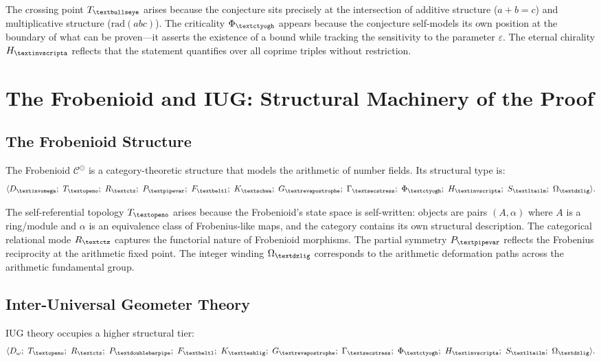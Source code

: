 \documentclass[12pt]{article}
\newcommand{\invomega}{\text{\textinvomega}}
\newcommand{\beltl}{\text{\textbeltl}}
\newcommand{\revapostrophe}{\text{\textrevapostrophe}}
\newcommand{\secstress}{\text{\textsecstress}}
\newcommand{\igbullseye}{\text{\textbullseye}}
\newcommand{\igschwa}{\text{\textschwa}}
\newcommand{\ctyogh}{\text{\textctyogh}}
\newcommand{\invscripta}{\text{\textinvscripta}}
\newcommand{\ltailm}{\text{\textltailm}}
\newcommand{\openo}{\text{\textopeno}}
\newcommand{\ctz}{\text{\textctz}}
\newcommand{\pipevar}{\text{\textpipevar}}
\newcommand{\dzlig}{\text{\textdzlig}}
\newcommand{\doublebarpipe}{\text{\textdoublebarpipe}}
\newcommand{\teshlig}{\text{\textteshlig}}
\begin{document}
The crossing point $T_{\igbullseye}$ arises because the conjecture sits precisely at the intersection of additive structure ($a + b = c$) and multiplicative structure ($\text{rad}(abc)$). The criticality $\Phi_{\ctyogh}$ appears because the conjecture self-models its own position at the boundary of what can be proven---it asserts the existence of a bound while tracking the sensitivity to the parameter $\varepsilon$. The eternal chirality $H_{\invscripta}$ reflects that the statement quantifies over all coprime triples without restriction.
\section{The Frobenioid and IUG: Structural Machinery of the Proof}

\subsection{The Frobenioid Structure}

The Frobenioid $\mathcal{C}^\odot$ is a category-theoretic structure that models the arithmetic of number fields. Its structural type is:
\begin{equation}
\langle D_{\invomega};\ T_{\openo};\ R_{\ctz};\ P_{\pipevar};\ F_{\beltl};\ K_{\igschwa};\ G_{\revapostrophe};\ \Gamma_{\secstress};\ \Phi_{\ctyogh};\ H_{\invscripta};\ S_{\ltailm};\ \Omega_{\dzlig} \rangle.
\end{equation}

The self-referential topology $T_{\openo}$ arises because the Frobenioid's state space is self-written: objects are pairs $(A, \alpha)$ where $A$ is a ring/module and $\alpha$ is an equivalence class of Frobenius-like maps, and the category contains its own structural description. The categorical relational mode $R_{\ctz}$ captures the functorial nature of Frobenioid morphisms. The partial symmetry $P_{\pipevar}$ reflects the Frobenius reciprocity at the arithmetic fixed point. The integer winding $\Omega_{\dzlig}$ corresponds to the arithmetic deformation paths across the arithmetic fundamental group.

\subsection{Inter-Universal Geometer Theory}

IUG theory occupies a higher structural tier:
\begin{equation}
\langle D_\omega;\ T_{\openo};\ R_{\ctz};\ P_{\doublebarpipe};\ F_{\beltl};\ K_{\teshlig};\ G_{\revapostrophe};\ \Gamma_{\secstress};\ \Phi_{\ctyogh};\ H_{\invscripta};\ S_{\ltailm};\ \Omega_{\dzlig} \rangle.
\end{equation}
\end{document}
